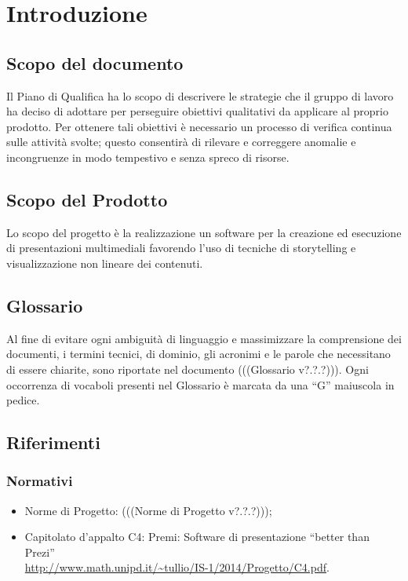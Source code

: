 \section{Introduzione}
\subsection{Scopo del documento}
Il Piano di Qualifica ha lo scopo di descrivere le strategie che il gruppo di lavoro ha deciso di adottare per perseguire obiettivi qualitativi da applicare al proprio prodotto. Per ottenere tali obiettivi è necessario un processo di verifica continua sulle attività svolte; questo consentirà di rilevare e correggere anomalie e incongruenze in modo tempestivo e senza spreco di risorse.
\subsection{Scopo del Prodotto}
Lo scopo del progetto è la realizzazione un software per la creazione ed esecuzione di presentazioni multimediali favorendo l’uso di tecniche di storytelling e visualizzazione non lineare dei contenuti.
\subsection{Glossario}
Al fine di evitare ogni ambiguità di linguaggio e massimizzare la comprensione dei documenti, i termini tecnici, di dominio, gli acronimi e le parole che necessitano di essere chiarite, sono riportate nel documento (((Glossario v?.?.?))). Ogni occorrenza di vocaboli presenti nel Glossario è marcata da una “G” maiuscola in pedice.
\subsection{Riferimenti}

\subsubsection{Normativi}
\begin{itemize}


\item Norme di Progetto: (((Norme di Progetto v?.?.?)));
\item Capitolato d’appalto C4: Premi: Software di presentazione “better than Prezi” \\
\url{http://www.math.unipd.it/~tullio/IS-1/2014/Progetto/C4.pdf}.
\end{itemize}
